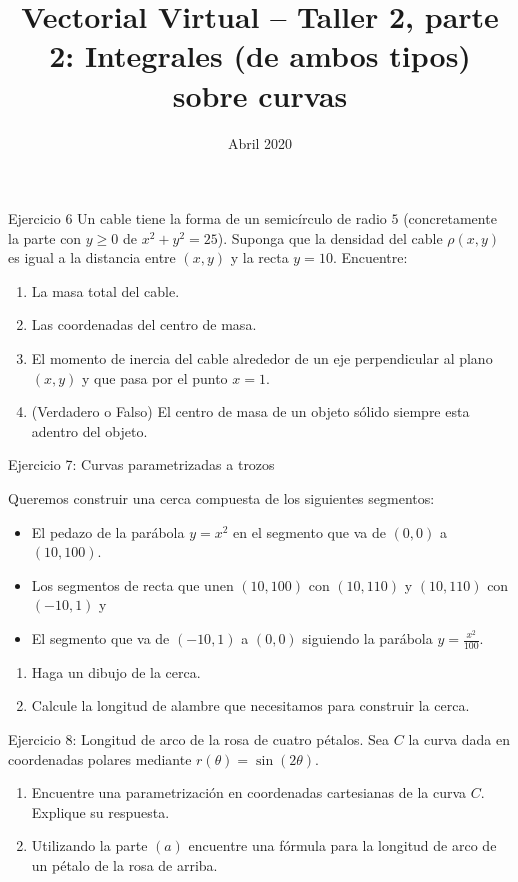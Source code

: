 \documentclass[usepdftitle=false]{beamer}
\title[]{Vectorial Virtual -- Taller 2, parte 2: Integrales (de ambos tipos) sobre curvas}
\date{Abril 2020}
\begin{document}
\begin{frame}
  \titlepage
\end{frame}

\begin{frame}{Ejercicio 6}
Un cable tiene la forma de un semic\'irculo de radio $5$ (concretamente la parte con $y\geq 0$ de $x^2+y^2=25$). Suponga que la densidad del cable $\rho(x,y)$ es igual a la distancia entre $(x,y)$ y la recta $y=10$. Encuentre:

\begin{enumerate}
\item La masa total del cable.
\item Las coordenadas del centro de masa.
\item El momento de inercia del cable alrededor de un eje perpendicular al plano $(x,y)$ y que pasa por el punto $x=1$.
\item (Verdadero o Falso) El centro de masa de un objeto s\'olido siempre esta adentro del objeto.

\end{enumerate}

\end{frame}

\begin{frame}{Ejercicio 7: Curvas parametrizadas a trozos}

Queremos construir una cerca compuesta de los siguientes segmentos: 

\begin{itemize}
\item El pedazo de la par\'abola $y=x^2$ en el segmento que va de $(0,0)$ a $(10,100)$.
\item Los segmentos de recta que unen  $(10,100)$ con $(10,110)$ y $(10,110)$ con $(-10,1)$ y
\item El segmento que va de $(-10,1)$ a $(0,0)$ siguiendo la par\'abola $y=\frac{x^2}{100}$.
\end{itemize}

\begin{enumerate}
\item Haga un dibujo de la cerca.
\item Calcule la longitud de alambre que necesitamos para construir la cerca.
\end{enumerate}



\end{frame}

\begin{frame}{Ejercicio 8: Longitud de arco de la rosa de cuatro p\'etalos.}
Sea $C$ la curva dada en coordenadas polares mediante $r(\theta)=\sin(2\theta)$.

\begin{enumerate}
\item Encuentre una parametrizaci\'on en coordenadas cartesianas de la curva $C$. Explique su respuesta.

\item Utilizando la parte $(a)$ encuentre una f\'ormula para la longitud de arco de un p\'etalo de la  rosa de arriba.
\end{enumerate}

 
\end{frame}
\end{document}
